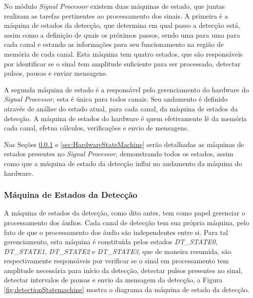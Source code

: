 \documentclass[monografia]{subfiles}
\begin{document}
	No módulo \textit{Signal Processor} existem duas máquinas de estado, que juntas realizam as tarefas pertinentes ao processamento dos sinais.
	A primeira é a máquina de estados da detecção, que determina em qual passo a detecção está, assim como a definição de quais os próximos passos, 
	sendo uma para uma para cada canal e estando as informações para seu funcionamento na região de memória de cada canal. Esta máquina tem quatro 
	estados, que são responsáveis por identificar se o sinal tem amplitude suficiente para ser processado, detectar pulsos, pausas e enviar mensagens.

	A segunda máquina de estado é a responsável pelo gerenciamento do hardware do \textit{Signal Processor}, esta é única para todos canais. Seu andamento é
	definido através de análise do estado atual, para cada canal, da máquina de estados da detecção. A máquina de estados do hardware é quem efetivamente
	lê da memória cada canal, efetua cálculos, verificações e envio de mensagens.

	Nas Seções \ref{sec:detectionStateMachine} e \ref{sec:HardwareStateMachine} serão detalhadas as máquinas de estados presentes no 
	\textit{Signal Processor}, demonstrando todos os estados, assim como que a máquina de estado da detecção influi no andamento da 
	máquina do hardware.


		\subsubsection{Máquina de Estados da Detecção}
		\label{sec:detectionStateMachine}		
			A máquina de estados da detecção, como dito antes, tem como papel gerenciar o processamento dos áudios. Cada canal de detecção tem sua própria
			máquina, pelo fato de que o processamento dos áudio são independentes entre si. Para tal gerenciamento, esta máquina é constituída pelos
			estados \textit{DT\_STATE0}, \textit{DT\_STATE1}, \textit{DT\_STATE2} e \textit{DT\_STATE3}, que de maneira resumida, são respectivamente responsáveis
			por verificar se o sinal em processamento tem amplitude necessária para início da detecção, detectar pulsos presentes no sinal, detectar intervalos
			de pausas e envio da mensagem da detecção, a Figura \ref{fig:detectionStatemachine} mostra o diagrama da máquina de estado da detecção. 
\end{document}
